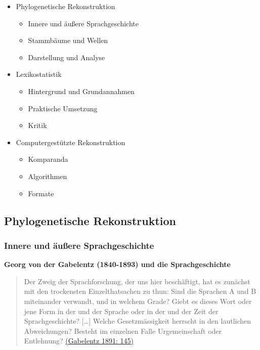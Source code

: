 \begin{itemize}
\itemsep1pt\parskip0pt
\item
  {Phylogenetische Rekonstruktion}

  \begin{itemize}
  \itemsep1pt\parskip0pt
  \item
    {Innere und äußere Sprachgeschichte}
  \item
    {Stammbäume und Wellen}
  \item
    {Darstellung und Analyse}
  \end{itemize}
\item
  {Lexikostatistik}

  \begin{itemize}
  \itemsep1pt\parskip0pt
  \item
    {Hintergrund und Grundannahmen}
  \item
    {Praktische Umsetzung}
  \item
    {Kritik}
  \end{itemize}
\item
  {Computergestützte Rekonstruktion}

  \begin{itemize}
  \itemsep1pt\parskip0pt
  \item
    {Komparanda}
  \item
    {Algorithmen}
  \item
    {Formate}
  \end{itemize}
\end{itemize}

\subsection{\texorpdfstring{{Phylogenetische
Rekonstruktion}}{Phylogenetische Rekonstruktion}}

\subsubsection{\texorpdfstring{{Innere und äußere
Sprachgeschichte}}{Innere und äußere Sprachgeschichte}}

\textbf{Georg von der Gabelentz (1840-1893) und die Sprachgeschichte}

\begin{quote}
Der Zweig der Sprachforschung, der uns hier beschäftigt, hat es zunächst
mit den trockensten Einzelthatsachen zu thun: Sind die Sprachen A und B
miteinander verwandt, und in welchem Grade? Giebt es dieses Wort oder
jene Form in der und der Sprache oder in der und der Zeit der
Sprachgeschichte? {[}\ldots{}{]} Welche Gesetzmässigkeit herrscht in den
lautlichen Abweichungen? Besteht im einzelnen Falle Urgemeinschaft oder
Entlehnung?
\href{http://bibliography.lingpy.org?key=Gabelentz1891}{(Gabelentz 1891:
145)}
\end{quote}

